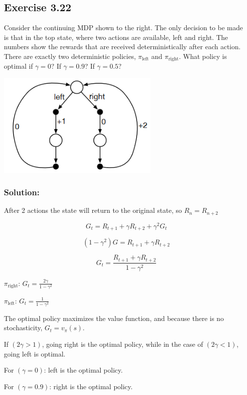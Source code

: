 \subsection*{Exercise 3.22}
Consider the continuing MDP shown to the
right. The only decision to be made is that in the top state,
where two actions are available, left and right. The numbers
show the rewards that are received deterministically after
each action. There are exactly two deterministic policies,
$\pi_\text{left}$ and $\pi_\text{right}$. What policy is optimal if  $\gamma = 0$? If  $\gamma = 0.9$?
If  $\gamma = 0.5$?
\begin{center}
    \includegraphics[width=0.6\textwidth]{chapters_latex/figures/ex_03_22.png}
\end{center}

\subsubsection*{Solution:}

After 2 actions the state will return to the original state, so $R_n = R_{n+2}$

\[
G_t = R_{t+1} + \gamma R_{t+2} + \gamma^2 G_t
\]

\[
(1 - \gamma^2) G = R_{t+1} + \gamma R_{t+2}
\]

\[
G_t = \frac{R_{t+1} + \gamma R_{t+2}}{1 - \gamma^2}
\]

$\pi_{\text{right}}$:   $G_t = \frac{2 \gamma}{1 - \gamma^2} $

$\pi_{\text{left}}$:   $G_t = \frac{1}{1 - \gamma^2} $

The optimal policy maximizes the value function, and because there is no stochasticity, $G_t = v_{\pi}(s)$.

If $(2\gamma > 1)$, going right is the optimal policy, while in the case of $(2\gamma < 1)$, going left is optimal.

For $(\gamma = 0)$: left is the optimal policy.

For $(\gamma = 0.9)$: right is the optimal policy.

